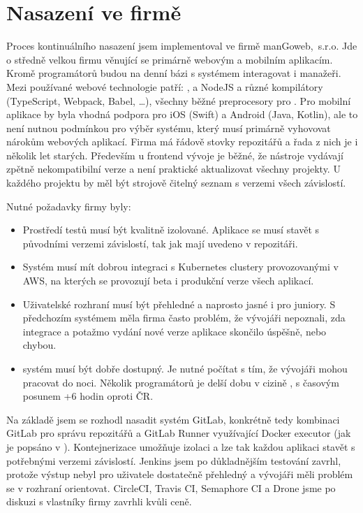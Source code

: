 \chapter{Nasazení ve firmě}
    Proces kontinuálního nasazení jsem implementoval ve firmě manGoweb,~s.r.o. Jde o středně velkou firmu věnující se primárně webovým a mobilním aplikacím. Kromě programátorů budou na denní bázi s \CI systémem interagovat i manažeři. Mezi používané webové technologie patří: ,  a NodeJS a různé kompilátory (TypeScript, Webpack, Babel, …), všechny běžné preprocesory pro . Pro mobilní aplikace by byla vhodná podpora pro iOS (Swift) a Android (Java, Kotlin), ale to není nutnou podmínkou pro výběr \CICD systému, který musí primárně vyhovovat nárokům webových aplikací. Firma má řádově stovky repozitářů a řada z nich je i několik let starých. Především u frontend vývoje je běžné, že nástroje vydávají zpětně nekompatibilní verze a není praktické aktualizovat všechny projekty. U každého projektu by měl být strojově čitelný seznam s verzemi všech závislostí.

    Nutné požadavky firmy byly:
    \begin{itemize}
        \item Prostředí testů musí být kvalitně izolované. Aplikace se musí stavět s původními verzemi závislostí, tak jak mají uvedeno v repozitáři.
        \item Systém musí mít dobrou integraci s Kubernetes clustery provozovanými v AWS, na kterých se provozují beta i produkční verze všech aplikací.
        \item Uživatelské rozhraní musí být přehledné a naprosto jasné i pro juniory. S předchozím systémem měla firma často problém, že vývojáři nepoznali, zda integrace a potažmo vydání nové verze aplikace skončilo úspěšně, nebo chybou.
        \item \CICD systém musí být dobře dostupný. Je nutné počítat s tím, že vývojáři mohou pracovat do noci. Několik programátorů je delší dobu v cizině
, s časovým posunem +6 hodin oproti ČR.
    \end{itemize}

    Na základě  jsem se rozhodl nasadit \CICD systém GitLab, konkrétně tedy kombinaci GitLab pro správu repozitářů a GitLab Runner využívající Docker executor (jak je popsáno v ). Kontejnerizace umožňuje izolaci a lze tak každou aplikaci stavět s potřebnými verzemi závislostí. Jenkins jsem po důkladnějším testování zavrhl, protože výstup nebyl pro uživatele dostatečně přehledný a vývojáři měli problém se v rozhraní orientovat. CircleCI, Travis CI, Semaphore CI a Drone jsme po diskuzi s vlastníky firmy zavrhli kvůli ceně.


